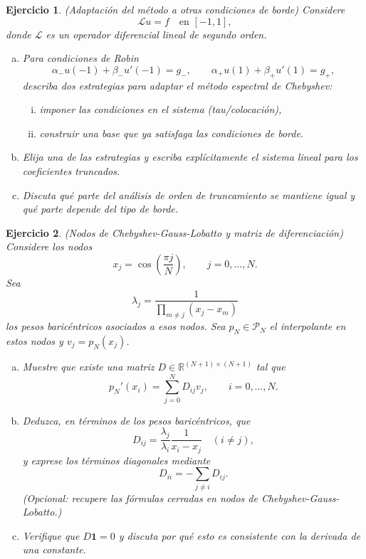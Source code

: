 \documentclass[12pt]{article}
\newtheorem{exercise}{Ejercicio}
\newcommand{\bej}{\begin{exercise}\rm}
\newcommand{\fej}{\end{exercise}}
\begin{document}
\bej
(Adaptación del método a otras condiciones de borde)
Considere
\[
\mathcal L u = f \quad \text{en }[-1,1],
\]
donde $\mathcal L$ es un operador diferencial lineal de segundo orden.
\begin{enumerate}[(a)]
    \item Para condiciones de Robin
    \[
    \alpha_-u(-1)+\beta_-u'(-1)=g_-,
    \qquad
    \alpha_+u(1)+\beta_+u'(1)=g_+,
    \]
    describa dos estrategias para adaptar el método espectral de Chebyshev:
    \begin{enumerate}[i.]
        \item imponer las condiciones en el sistema (tau/colocación),
        \item construir una base que ya satisfaga las condiciones de borde.
    \end{enumerate}
    \item Elija una de las estrategias y escriba explícitamente el sistema lineal para los coeficientes truncados.
    \item Discuta qué parte del análisis de orden de truncamiento se mantiene igual y qué parte depende del tipo de borde.
\end{enumerate}
\fej

\bej
(Nodos de Chebyshev-Gauss-Lobatto y matriz de diferenciación)
Considere los nodos
\[
x_j=\cos\left(\frac{\pi j}{N}\right),\qquad j=0,\ldots,N.
\]
Sea
\[
\lambda_j=\frac{1}{\prod_{m\ne j}(x_j-x_m)}
\]
los pesos baricéntricos asociados a esos nodos.
Sea $p_N\in\mathcal P_N$ el interpolante en estos nodos y $v_j=p_N(x_j)$.
\begin{enumerate}[(a)]
    \item Muestre que existe una matriz $D\in\mathbb R^{(N+1)\times(N+1)}$ tal que
    \[
    p_N'(x_i)=\sum_{j=0}^{N}D_{ij}v_j,
    \qquad i=0,\ldots,N.
    \]
    \item Deduzca, en términos de los pesos baricéntricos, que
    \[
    D_{ij}=\frac{\lambda_j}{\lambda_i}\frac{1}{x_i-x_j}\quad(i\ne j),
    \]
    y exprese los términos diagonales mediante
    \[
    D_{ii}=-\sum_{j\ne i}D_{ij}.
    \]
    (Opcional: recupere las fórmulas cerradas en nodos de Chebyshev-Gauss-Lobatto.)
    \item Verifique que $D\mathbf 1=0$ y discuta por qué esto es consistente con la derivada de una constante.
\end{enumerate}
\fej
\end{document}
